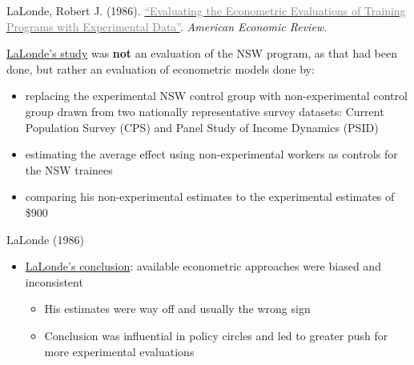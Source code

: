 \documentclass{beamer}
\newcommand{\myurlshort}[2]{\href{#1}{\textcolor{gray}{\textsf{#2}}}}
\begin{document}
\begin{frame}[plain]
	\begin{center}
	LaLonde, Robert J. (1986). \myurlshort{http://business.baylor.edu/scott_cunningham/teaching/lalonde-1986.pdf}{``Evaluating the Econometric Evaluations of Training Programs with Experimental Data''}. \emph{American Economic Review}. 
	\end{center}
	
\underline{LaLonde's study} was \textbf{not} an evaluation of the NSW program, as that had been done, but rather an evaluation of econometric models done by:
		\begin{itemize}
		\item replacing the experimental NSW control group with non-experimental control group drawn from two nationally representative survey datasets: Current Population Survey (CPS) and Panel Study of Income Dynamics (PSID)
		\item estimating the average effect using non-experimental workers as controls for the NSW trainees 
		\item comparing his non-experimental estimates to the experimental estimates of \$900
		\end{itemize}
\end{frame}

\begin{frame}{LaLonde (1986)}

\begin{itemize}

	\item \underline{LaLonde's conclusion}: available econometric approaches were biased and inconsistent
		\begin{itemize}
		\item His estimates were way off and usually the wrong sign
		\item Conclusion was influential in policy circles and led to greater push for more experimental evaluations
		\end{itemize}

\end{itemize}

\end{frame}
\end{document}
